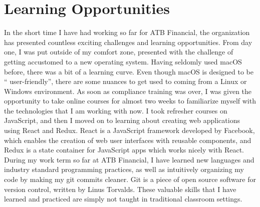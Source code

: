 \documentclass[letterpaper,12pt]{article}
\begin{document}


\section{Learning Opportunities}

In the short time I have had working so far for ATB Financial, the organization has presented
countless exciting challenges and learning opportunities.
From day one, I was put outside of my comfort zone, presented with the challenge of
getting accustomed to a new operating system. Having seldomly used macOS before,
there was a bit of a learning curve. Even though macOS is designed to be `` user-friendly'',
there are some nuances to get used to coming from a Linux or Windows environment.
As soon as compliance training was over, I was given the opportunity to take online
courses for almost two weeks to familiarize myself with the technologies that I am
working with now. I took refresher courses on JavaScript, and then I moved on to learning
about creating web applications using React and Redux. React is a JavaScript framework developed by Facebook,
which enables the creation of web user interfaces with reusable components\cite{react}, and Redux is a state container
for JavaScript apps\cite{redux} which works nicely with React. 
During my work term so far at ATB Financial, I have learned new languages and industry standard programming
practices, as well as intuitively organizing my code by making my git commits cleaner. Git is a piece
of open source software for version control, written by Linus Torvalds.\cite{git}
These valuable skills that I have learned and practiced are simply not taught in traditional classroom settings.
\end{document}
